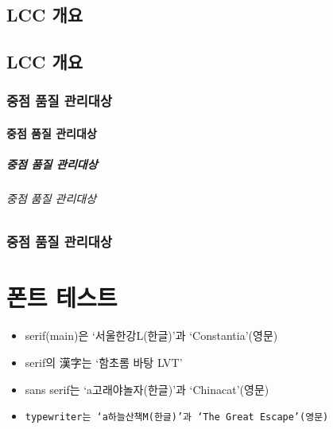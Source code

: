 \documentclass[12pt,a4paper]{book}
\begin{document}
		\newpage
		\minitoc				%

\newpage  \null
\section{LCC 개요}


\newpage
\section{LCC 개요}

	\subsection{중점 품질 관리대상}

		\subsubsection{중점 품질 관리대상}

		\paragraph{중점 품질 관리대상}

		\subparagraph{중점 품질 관리대상}

		\Blinddocument
				
		\newpage   \null
		\subsection{중점 품질 관리대상}
		
\newpage
\chapter{폰트 테스트}

		\begin{itemize}
		\item \textrm{\huge serif(main)은 `서울한강L(한글)'과 `Constantia'(영문)}
		\item \textrm{\huge serif의 漢字는 `함초롬 바탕 LVT'}
		\item \textsf{\huge sans serif는 `a고래야놀자(한글)'과 `Chinacat'(영문)}
		\item \texttt{\huge typewriter는 `a하늘산책M(한글)'과 `The Great Escape'(영문)}
		\end{itemize}
\end{document}
